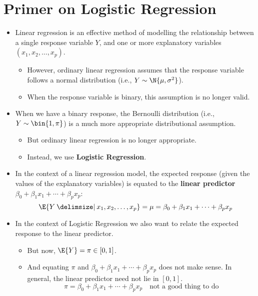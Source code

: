 \section*{Primer on Logistic Regression}
\begin{itemize}
      \item Linear regression is an effective method of modelling the relationship between a single response variable
            $ Y $, and one or more explanatory variables $ (x_1,x_2,\ldots,x_p) $.
            \begin{itemize}
                  \item However, ordinary linear regression assumes that the response variable follows a normal distribution
                        (i.e., $ Y \sim \N{\mu,\sigma^2} $).
                  \item When the response variable is binary, this assumption is no longer valid.
            \end{itemize}
      \item When we have a binary response, the Bernoulli distribution (i.e., $ Y \sim \bin{1,\pi} $) is a much more
            appropriate distributional assumption.
            \begin{itemize}
                  \item But ordinary linear regression is no longer appropriate.
                  \item Instead, we use \textbf{Logistic Regression}.
            \end{itemize}
      \item In the context of a linear regression model, the expected response (given
            the values of the explanatory variables) is equated to the \textbf{linear predictor} $ \beta_0+\beta_1x_1+\cdots+\beta_p x_p $:
            \[ \E{Y\given x_1,x_2,\ldots,x_p}=\mu=\beta_0+\beta_1x_1+\cdots+\beta_p x_p \]
      \item In the context of Logistic Regression we also want to relate the expected response to the linear predictor.
            \begin{itemize}
                  \item But now, $ \E{Y}=\pi\in[0,1] $.
                  \item And equating $ \pi $ and $ \beta_0+\beta_1 x_1+\cdots+\beta_p x_p $ does not make sense. In general, the linear predictor need not lie in $ [0,1] $.
                        \[ \pi=\beta_0+\beta_1x_1+\cdots+\beta_p x_p\quad\text{not a good thing to do} \]
            \end{itemize}

\end{itemize}
